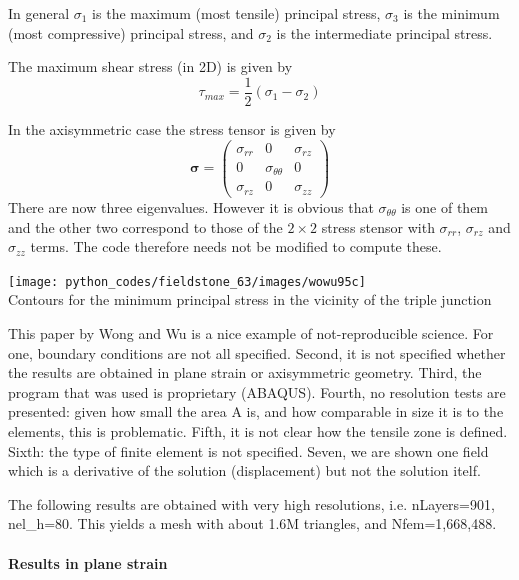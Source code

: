 In general $\sigma_1$ is the maximum (most tensile) principal stress, 
$\sigma_3$ is the minimum (most compressive) principal stress, 
and $\sigma_2$ is the intermediate principal stress.

The maximum shear stress (in 2D) is given by
\[
\tau_{max} = \frac12(\sigma_1-\sigma_2)
\]

In the axisymmetric case the stress tensor is given by 
\[
{\bm \sigma} = 
\left(
\begin{array}{ccc}
\sigma_{rr} & 0 & \sigma_{rz} \\
0 & \sigma_{\theta\theta} & 0 \\
\sigma_{rz} & 0 & \sigma_{zz} 
\end{array}
\right)
\]
There are now three eigenvalues. However it is obvious that $\sigma_{\theta\theta}$ is 
one of them and the other two correspond to those of the $2\times 2$ stress stensor with 
$\sigma_{rr}$, $\sigma_{rz}$ and $\sigma_{zz}$ terms.
The code therefore needs not be modified to compute these. 



\begin{center}
\texttt{[image: python\_codes/fieldstone\_63/images/wowu95c]}\\
{\captionfont Contours for the minimum principal stress in the vicinity of the triple junction}
\end{center}

\begin{remark}
This paper by Wong and Wu is a nice example of not-reproducible science. For one, boundary conditions 
are not all specified. Second, it is not specified whether the results are obtained in plane strain 
or axisymmetric geometry. Third, the program that was used is proprietary (ABAQUS). 
Fourth, no resolution tests are presented: given how small the area A is, and how comparable 
in size it is to the elements, this is problematic. Fifth, it is not clear how the 
tensile zone is defined. Sixth: the type of finite element is not specified. Seven, 
we are shown one field which is a derivative of the solution (displacement) but not the 
solution itelf.  
\end{remark}

The following results are obtained with very high resolutions, i.e. 
nLayers=901, nel\_h=80. This yields a mesh with about 1.6M triangles, 
and Nfem=1,668,488.

\newpage
\paragraph{Results in plane strain}


